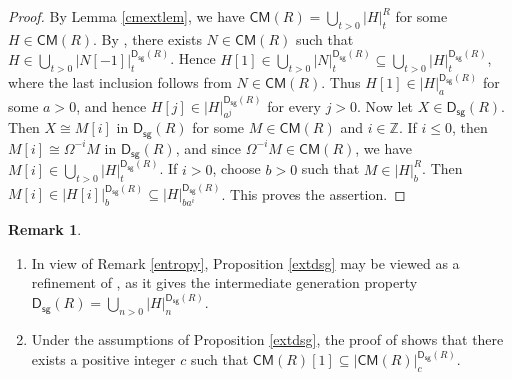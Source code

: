 \documentclass[10pt]{amsart}
\theoremstyle{definition}
\newtheorem{rem}[thm]{Remark}
\theoremstyle{remark}
\numberwithin{equation}{thm}
\def\CM{\mathsf{CM}}
\def\ds{\operatorname{\mathsf{D_{sg}}}}
\def\le{\leqslant}
\def\syz{\Omega}
\begin{document}
\begin{proof} 
By Lemma \ref{cmextlem}, we have $\CM(R)=\bigcup_{t>0}{|H|}^{R}_{t}$ for some $H\in\CM(R)$. 
By \cite[Proposition 4.4(1)]{AIT}, there exists $N\in\CM(R)$ such that $H\in\bigcup_{t>0}{|N[-1]|}^{\ds(R)}_{t}$. 
Hence $H[1]\in\bigcup_{t>0}{|N|}^{\ds(R)}_{t}\subseteq\bigcup_{t>0}{|H|}^{\ds(R)}_{t}$, where the last inclusion follows from $N\in\CM(R)$. 
Thus $H[1]\in{|H|}^{\ds(R)}_{a}$ for some $a>0$, and hence $H[j]\in{|H|}^{\ds(R)}_{a^j}$ for every $j>0$.
Now let $X\in\ds(R)$. 
Then $X\cong M[i]$ in $\ds(R)$ for some $M\in\CM(R)$ and $i\in\mathbb Z$. 
If $i\le0$, then $M[i]\cong\syz^{-i}M$ in $\ds(R)$, and since $\syz^{-i}M\in\CM(R)$, we have $M[i]\in\bigcup_{t>0}{|H|}_{t}^{\ds(R)}$. 
If $i>0$, choose $b>0$ such that $M\in{|H|}_{b}^{R}$.
Then $M[i]\in{|H[i]|}_{b}^{\ds(R)}\subseteq{|H|}_{ba^i}^{\ds(R)}$. 
This proves the assertion. 
\end{proof} 
\begin{rem}
\begin{enumerate}[\rm(1)]
\item 
In view of Remark \ref{entropy}, Proposition \ref{extdsg} may be viewed as a refinement of \cite[Proposition 4.4(2)]{AIT}, as it gives the intermediate generation property $\ds(R)=\bigcup_{n>0}{|H|}_{n}^{\ds(R)}$.
\item 
Under the assumptions of Proposition \ref{extdsg}, the proof of \cite[Proposition 4.4(1)]{AIT} shows that there exists a positive integer $c$ such that $\CM(R)[1]\subseteq{|\CM(R)|}_{c}^{\ds(R)}$.
\end{enumerate}
\end{rem}
\end{document}
